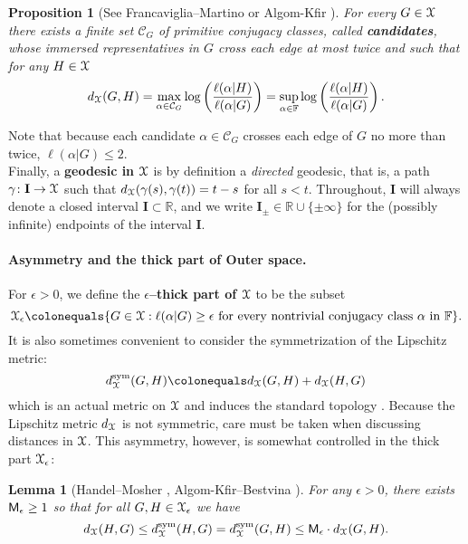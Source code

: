 \documentclass[letterpaper,fleqn]{article}
\theoremstyle{plain}
\newtheorem{lemma}[theorem]{Lemma}
\newtheorem{proposition}[theorem]{Proposition}
\theoremstyle{definition}
\newcommand{\define}[1]{\textbf{#1}}
\newcommand{\free}{\mathbb{F}} %
\newcommand{\os}{{\EuScript X}} %
\newcommand{\dsym}{d^{\mathrm{sym}}_\os} %
\newcommand{\sym}{{\sf M}} %
\newcommand{\I}{\mathbf{I}}
\begin{document}
\begin{proposition}[See Francaviglia--Martino \cite{FMout} or Algom-Kfir \cite{AKaxis}]\label{pro: distance}
For every $G\in \os$ there exists a finite set $\mathcal{C}_G$ of primitive conjugacy classes, called \define{candidates}, whose immersed representatives in $G$ cross each edge at most twice and such that for any $H\in \os$
\[
d_\os(G,H) = \max_{\alpha\in \mathcal{C}_G} \log\left(\frac{\ell(\alpha\vert H)}{ \ell(\alpha\vert G)}\right) = \sup_{\alpha\in \free} \log\left(\frac{\ell(\alpha\vert H)}{ \ell(\alpha\vert G)}\right).\]
\end{proposition}
\noindent Note that because each candidate $\alpha \in \mathcal{C}_G$ crosses each edge of $G$ no more than twice, $\ell(\alpha|G) \le 2$.\\

Finally, a \define{geodesic in $\os$} is by definition a \emph{directed} geodesic, that is, a path $\gamma\colon \I\to \os$ such that $d_\os(\gamma(s),\gamma(t)) = t-s$ for all $s<t$. Throughout, $\I$ will always denote a closed interval $\I \subset \mathbb{R}$, and we write $\I_{\pm} \in \mathbb{R} \cup \{\pm \infty\}$ for the (possibly infinite) endpoints of the interval $\I$.

\paragraph{Asymmetry and the thick part of Outer space.} For $\epsilon > 0$, we define the \define{$\epsilon$--thick part of $\os$} to be the subset
\[\os_\epsilon \colonequals \{G\in \os : \ell(\alpha\vert G) \ge \epsilon\text{ for every nontrivial conjugacy class $\alpha$ in $\free$}\}.\]
It is also sometimes convenient to consider the symmetrization of the Lipschitz metric:
\[\dsym(G,H) \colonequals d_\os(G,H) + d_\os(H,G)\]
which is an actual metric on $\os$ and induces the standard topology \cite{FMout}. Because the Lipschitz metric $d_\os$ is not symmetric, care must be taken when discussing distances in $\os$. This asymmetry, however, is somewhat controlled in the thick part $\os_\epsilon$:

\begin{lemma}[Handel--Mosher \cite{handel2007expansion}, Algom-Kfir--Bestvina \cite{AlBest}] \label{lem: symmetric_in_thick}
For any $\epsilon>0$, there exists $\sym_\epsilon\geq 1$ so that for all $G,H\in \os_\epsilon$ we have
\[ d_\os(H,G) \le \dsym(H,G) = \dsym(G,H) \le \sym_\epsilon \cdot d_\os(G,H).\]
\end{lemma}
\end{document}

